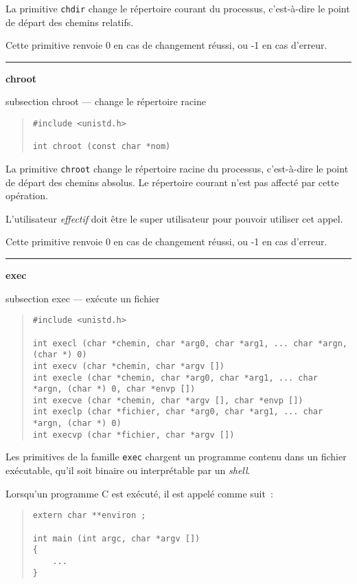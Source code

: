 \documentclass [twoside] {report}
\newcommand {\primitive} [1]
    {
	{\large \bf #1}
	\addcontentsline {toc} {subsection} {#1}
    }
\newcommand {\separation}
    {
	\vspace {7mm}
	\nopagebreak
	\hrule
    }
\begin{document}
La primitive {\tt chdir} change le répertoire
courant du processus, c'est-à-dire le point de
départ des chemins relatifs.

Cette primitive renvoie 0 en cas de changement
réussi, ou -1 en cas d'erreur.




\separation
\primitive {chroot} --- change le répertoire racine

\begin {quote}
\begin {verbatim}
#include <unistd.h>

int chroot (const char *nom)
\end{verbatim}
\end {quote}

La primitive {\tt chroot} change le répertoire
racine du processus, c'est-à-dire le point de
départ des chemins absolus. Le répertoire courant
n'est pas affecté par cette opération.

L'utilisateur {\em effectif} doit être le super
utilisateur pour pouvoir utiliser cet appel.

Cette primitive renvoie 0 en cas de changement
réussi, ou -1 en cas d'erreur.




\separation
\primitive {exec} --- exécute un fichier

\begin {quote}
\begin {verbatim}
#include <unistd.h>

int execl (char *chemin, char *arg0, char *arg1, ... char *argn, (char *) 0)
int execv (char *chemin, char *argv [])
int execle (char *chemin, char *arg0, char *arg1, ... char *argn, (char *) 0, char *envp [])
int execve (char *chemin, char *argv [], char *envp [])
int execlp (char *fichier, char *arg0, char *arg1, ... char *argn, (char *) 0)
int execvp (char *fichier, char *argv [])
\end{verbatim}
\end {quote}

Les primitives de la famille {\tt exec} chargent un
programme contenu dans un fichier exécutable,
qu'il soit binaire ou interprétable par un
{\em shell}.

Lorsqu'un programme C est exécuté, il est appelé
comme suit~:

\begin {quote}
\begin {verbatim}
extern char **environ ;

int main (int argc, char *argv [])
{
    ...
}
\end{verbatim}
\end {quote}
\end{document}
